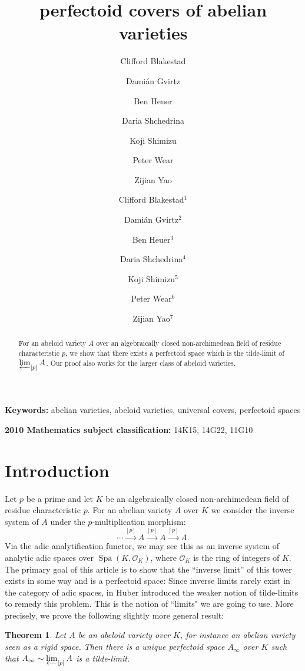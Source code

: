 \documentclass[10pt,oneside]{amsart}
\title[perfectoid covers of abelian varieties]{perfectoid  covers of abelian varieties}
\author{
	Clifford Blakestad\and
	Dami\'an Gvirtz\and
	Ben Heuer \and 
	Daria Shchedrina \and
	Koji Shimizu \and 
	Peter Wear \and
	Zijian Yao}
\author{
	Clifford Blakestad$^1$\and
	Dami\'an Gvirtz$^2$\and
	Ben Heuer$^3$ \and 
	Daria Shchedrina$^4$ \and
	Koji Shimizu$^5$ \and 
	Peter Wear$^6$ \and
	Zijian Yao$^7$}
\newtheorem{mainthm}{Theorem}
\theoremstyle{definition}
\begin{document}
	\maketitle
	\begin{abstract}
For an abeloid variety $A$ over an algebraically closed non-archimedean field of residue characteristic $p$, we show that there exists a perfectoid space which is the tilde-limit of $\varprojlim_{[p]}A$. Our proof also works for the larger class of abeloid varieties.
	\end{abstract}
	\smallskip
	\noindent \textbf{Keywords:} abelian varieties, abeloid varieties, universal covers, perfectoid spaces
	
	\smallskip
	\noindent \textbf{2010 Mathematics subject classification:} 14K15, 14G22, 11G10

	

	
	\section{Introduction} 

Let $p$ be a prime and let $K$ be an algebraically closed non-archimedean field of residue characteristic $p$.
For an abelian variety $A$ over $K$ we consider the inverse system of $A$ under the $p$-multiplication morphism:
\[\cdots\xrightarrow{[p]}A\xrightarrow{[p]}A\xrightarrow{[p]}A.\]
Via the adic analytification functor, we may see this as an inverse system of analytic adic spaces over $\operatorname{Spa}(K,\mathcal O_K)$, where $\mathcal O_K$ is the ring of integers of $K$.
The primary goal of this article is to show that the ``inverse limit'' of this tower exists in some way and is a perfectoid space: Since inverse limits rarely exist in the category of adic spaces, in \cite[Definition 2.4.2]{huber2013etale} Huber introduced the weaker notion of tilde-limits to remedy this problem. This is the notion of ``limits" we are going to use. More precisely, we prove the following slightly more general result:

 


\begin{mainthm} \label{thm:main_thm_intro}
	Let $A$ be an abeloid variety over $K$, for instance an abelian variety seen as a rigid space. Then there is a unique perfectoid space $A_\infty$ over $K$ such that
	$A_\infty \sim \varprojlim_{[p]} A$ is a tilde-limit.
\end{mainthm}
\end{document}
